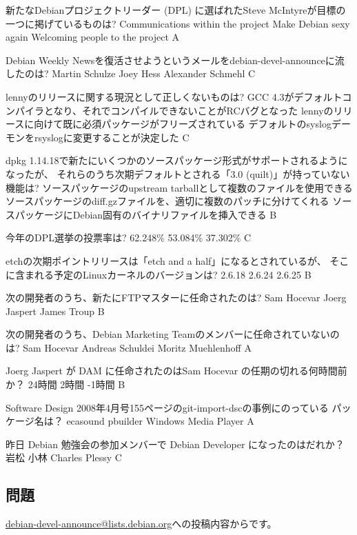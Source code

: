 \documentclass[mingoth,a4paper]{jsarticle}
\begin{document}
\begin{multicols}{2}
 \santaku
 {新たなDebianプロジェクトリーダー (DPL) に選ばれたSteve McIntyreが目標の一つに掲げているものは?}
 {Communications within the project}%
 {Make Debian sexy again}%
 {Welcoming people to the project}%
 {A}
 
 \santaku
 {Debian Weekly Newsを復活させようというメールをdebian-devel-announceに流したのは?}
 {Martin Schulze}
 {Joey Hess}
 {Alexander Schmehl}
 {C}
 
 \santaku
 {lennyのリリースに関する現況として正しくないものは?}
 {GCC 4.3がデフォルトコンパイラとなり、それでコンパイルできないことがRCバグとなった}
 {lennyのリリースに向けて既に必須パッケージがフリーズされている}
 {デフォルトのsyslogデーモンをrsyslogに変更することが決定した}%
 {C}
 
 \santaku
 {dpkg 1.14.18で新たにいくつかのソースパッケージ形式がサポートされるようになったが、
 それらのうち次期デフォルトとされる「3.0 (quilt)」が持っていない機能は?}
 {ソースパッケージのupstream tarballとして複数のファイルを使用できる}
 {ソースパッケージのdiff.gzファイルを、適切に複数のパッチに分けてくれる}
 {ソースパッケージにDebian固有のバイナリファイルを挿入できる}
 {B}
 
 \santaku
 {今年のDPL選挙の投票率は?}
 {62.248\%{}}%
 {53.084\%{}}%
 {37.302\%{}}%
 {C}
 
 \santaku
 {etchの次期ポイントリリースは「etch and a half」になるとされているが、
 そこに含まれる予定のLinuxカーネルのバージョンは?}
 {2.6.18}
 {2.6.24}
 {2.6.25}
 {B}
 
 \santaku
 {次の開発者のうち、新たにFTPマスターに任命されたのは?}
 {Sam Hocevar}
 {Joerg Jaspert}
 {James Troup}
 {B}
 
 \santaku
 {次の開発者のうち、Debian Marketing Teamのメンバーに任命されていないのは?}
 {Sam Hocevar}
 {Andreas Schuldei}
 {Moritz Muehlenhoff}
 {A}

 \santaku
 {Joerg Jaspert が DAM に任命されたのはSam Hocevar の任期の切れる何時間前か？}
 {24時間}
 {2時間}
 {-1時間}
 {B}

 \santaku
 {Software Design 2008年4月号155ページのgit-import-dscの事例にのっている
 パッケージ名は？}
 {ecasound}
 {pbuilder}
 {Windows Media Player}
 {A}

 \santaku
 {昨日 Debian 勉強会の参加メンバーで Debian Developer になったのはだれか？}
 {岩松}
 {小林}
 {Charles Plessy}
 {C}
 
 \subsection{問題}
 \url{debian-devel-announce@lists.debian.org}への投稿内容からです。
 

\end{multicols}
\end{document}
